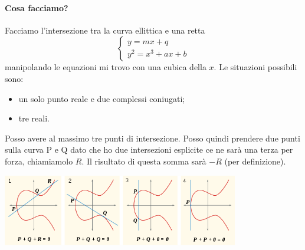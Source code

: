 \paragraph{Cosa facciamo?} Facciamo l'intersezione tra la curva ellittica e una retta
\[
\begin{cases}
	y = mx + q \\
	y^2 = x^3 + ax + b
\end{cases}
\]
manipolando le equazioni mi trovo con una cubica della $x$. Le situazioni possibili sono:
\begin{itemize}
	\item un solo punto reale e due complessi coniugati;
	\item tre reali.
\end{itemize} 
Posso avere al massimo tre punti di intersezione.  Posso quindi prendere due punti sulla curva P e Q dato che ho due intersezioni esplicite ce ne sarà una terza per forza, chiamiamolo $R$. Il risultato di questa somma sarà $-R$ (per definizione).
\begin{center}
    \includegraphics[width=390px]{images/ECC_2.png}
\end{center}


